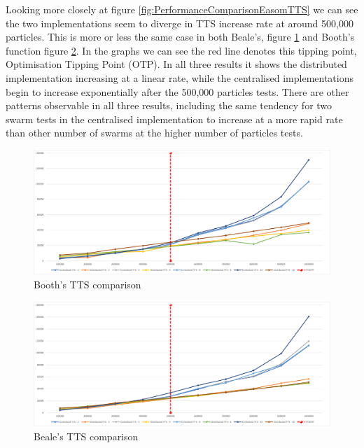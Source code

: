 \documentclass[oneside,12pt]{book}
\begin{document}
Looking more closely at figure \ref{fig:PerformanceComparisonEasomTTS} we can see the two implementations seem to diverge in TTS increase rate at around 500,000 particles. This is more or less the same case in both Beale's, figure \ref{fig:PerformanceComparisonBoothsTTS} and Booth's function figure \ref{fig:PerformanceComparisonBealeTTS}. In the graphs we can see the red line denotes this tipping point, Optimisation Tipping Point (OTP). In all three results it shows the distributed implementation increasing at a linear rate, while the centralised implementations begin to increase exponentially after the 500,000 particles tests. There are other patterns observable in all three results, including the same tendency for two swarm tests in the centralised implementation to increase at a more rapid rate than other number of swarms at the higher number of particles tests. 

\begin{figure}[H]
    \centering
    \includegraphics[scale=0.45]{Images/Graphs/PerformanceComparisonBoothsTTS.png}
    \caption{Booth's TTS comparison}
    \label{fig:PerformanceComparisonBoothsTTS}
\end{figure}

\begin{figure}[H]
    \centering
    \includegraphics[scale=0.45]{Images/Graphs/PerformanceComparisonBealeTTS.png}
    \caption{Beale's TTS comparison}
    \label{fig:PerformanceComparisonBealeTTS}
\end{figure}
\end{document}
